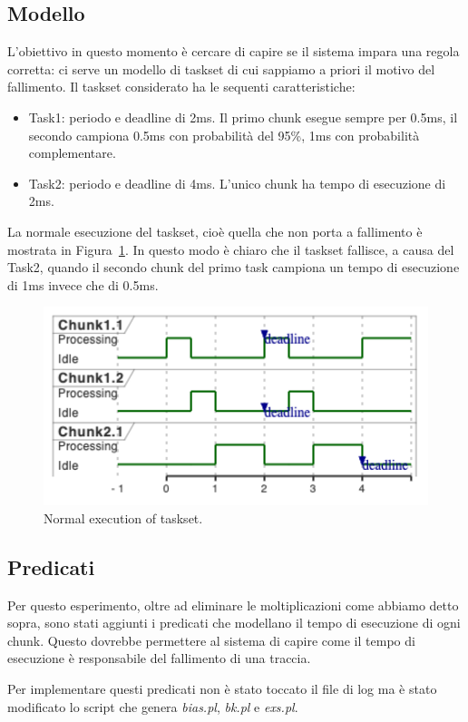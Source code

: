 \subsection{Modello}
L'obiettivo in questo momento è cercare di capire se il sistema impara una regola corretta: ci serve un modello di taskset di cui sappiamo a priori il motivo del fallimento. Il taskset considerato ha le sequenti caratteristiche:
\begin{itemize}
    \item Task1: periodo e deadline di 2ms. Il primo chunk esegue sempre per 0.5ms, il secondo campiona 0.5ms con probabilità del 95\%, 1ms con probabilità complementare.
    \item Task2: periodo e deadline di 4ms. L'unico chunk ha tempo di esecuzione di 2ms.
\end{itemize}
La normale esecuzione del taskset, cioè quella che non porta a fallimento è mostrata in Figura~\ref{fig:tasksetmodel}. In questo modo è chiaro che il taskset fallisce, a causa del Task2, quando il secondo chunk del primo task campiona un tempo di esecuzione di 1ms invece che di 0.5ms.
\begin{figure}[htbp]
    \centering
    \includegraphics[width=.75\textwidth]{images/3-esperimenti/tasksetmodel.pdf}
    \caption{Normal execution of taskset.}
    \label{fig:tasksetmodel}
\end{figure}

\subsection{Predicati}
Per questo esperimento, oltre ad eliminare le moltiplicazioni come abbiamo detto sopra, sono stati aggiunti i predicati che modellano il tempo di esecuzione di ogni chunk. Questo dovrebbe permettere al sistema di capire come il tempo di esecuzione è responsabile del fallimento di una traccia.

Per implementare questi predicati non è stato toccato il file di log ma è stato modificato lo script che genera \textit{bias.pl}, \textit{bk.pl} e \textit{exs.pl}.

